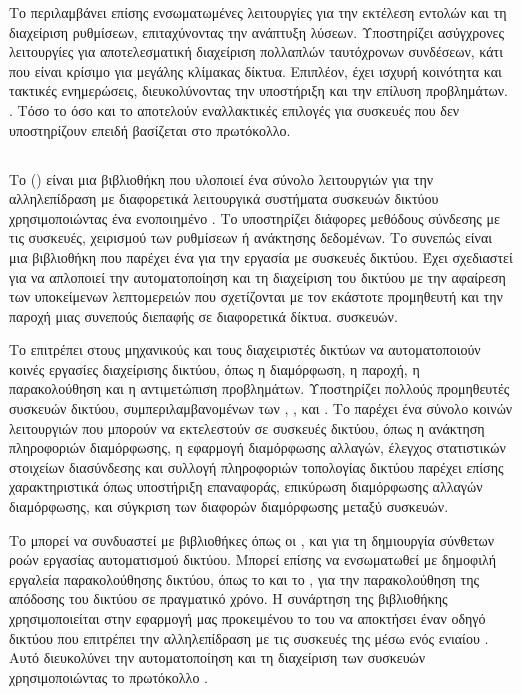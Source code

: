 Το  περιλαμβάνει επίσης ενσωματωμένες λειτουργίες για την εκτέλεση εντολών και τη διαχείριση ρυθμίσεων, επιταχύνοντας την ανάπτυξη λύσεων.
Υποστηρίζει ασύγχρονες λειτουργίες για αποτελεσματική διαχείριση πολλαπλών ταυτόχρονων συνδέσεων, κάτι που είναι κρίσιμο για μεγάλης κλίμακας δίκτυα. Επιπλέον, έχει ισχυρή 
κοινότητα και τακτικές ενημερώσεις, διευκολύνοντας την υποστήριξη και την επίλυση προβλημάτων.
. Τόσο το  όσο και το  αποτελούν εναλλακτικές επιλογές για συσκευές που δεν υποστηρίζουν  επειδή βασίζεται στο  πρωτόκολλο.


\subsection{}
Το  () είναι μια βιβλιοθήκη  που υλοποιεί ένα σύνολο λειτουργιών για την αλληλεπίδραση με διαφορετικά λειτουργικά συστήματα συσκευών δικτύου χρησιμοποιώντας ένα ενοποιημένο .
Το  υποστηρίζει διάφορες μεθόδους σύνδεσης με τις συσκευές, χειρισμού των ρυθμίσεων ή ανάκτησης δεδομένων. Το  συνεπώς είναι μια βιβλιοθήκη  που παρέχει ένα 
 για την εργασία με συσκευές δικτύου. Έχει σχεδιαστεί για να απλοποιεί την
αυτοματοποίηση και τη διαχείριση του δικτύου με την αφαίρεση των υποκείμενων λεπτομερειών που σχετίζονται με τον εκάστοτε προμηθευτή και την παροχή μιας συνεπούς διεπαφής σε διαφορετικά δίκτυα. 
συσκευών.


Το  επιτρέπει στους μηχανικούς και τους διαχειριστές δικτύων να αυτοματοποιούν κοινές εργασίες διαχείρισης δικτύου, όπως η διαμόρφωση, η παροχή, η παρακολούθηση και η 
αντιμετώπιση προβλημάτων. Υποστηρίζει πολλούς προμηθευτές συσκευών δικτύου, συμπεριλαμβανομένων των , ,  και .
Το  παρέχει ένα σύνολο κοινών λειτουργιών που μπορούν να εκτελεστούν σε συσκευές δικτύου, όπως η ανάκτηση πληροφοριών διαμόρφωσης, η εφαρμογή διαμόρφωσης 
αλλαγών, έλεγχος στατιστικών στοιχείων διασύνδεσης και συλλογή πληροφοριών τοπολογίας δικτύου παρέχει επίσης χαρακτηριστικά όπως υποστήριξη επαναφοράς, επικύρωση διαμόρφωσης 
αλλαγών διαμόρφωσης, και σύγκριση των διαφορών διαμόρφωσης μεταξύ συσκευών.


Το  μπορεί να συνδυαστεί με βιβλιοθήκες  όπως οι ,  και  για τη δημιουργία σύνθετων ροών εργασίας αυτοματισμού δικτύου. Μπορεί επίσης να ενσωματωθεί με δημοφιλή εργαλεία παρακολούθησης δικτύου, όπως το  και το , για την παρακολούθηση της απόδοσης του δικτύου σε πραγματικό χρόνο. Η συνάρτηση  της βιβλιοθήκης  χρησιμοποιείται στην εφαρμογή μας  προκειμένου το   του   να αποκτήσει έναν οδηγό δικτύου που επιτρέπει την αλληλεπίδραση με τις συσκευές της  μέσω ενός ενιαίου . Αυτό διευκολύνει την αυτοματοποίηση και τη διαχείριση των συσκευών χρησιμοποιώντας το πρωτόκολλο .


